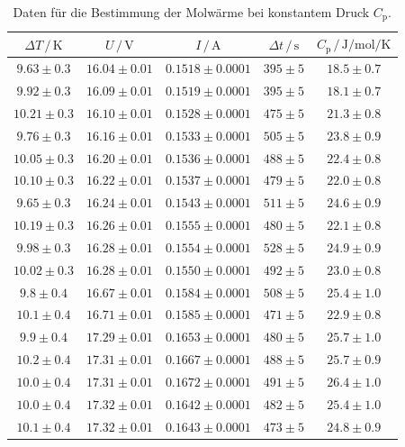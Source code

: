 \begin{table}
  \centering
  \caption{Daten für die Bestimmung der Molwärme bei konstantem Druck $C_\mathrm{p}$.}
  \label{tab:tab1}
  \begin{tabular}{c c c c c}
    \toprule
		$\Delta T \, / \, \si{\kelvin}$ & $U \, / \, \si{\volt}$ & $I \, / \, \si{\ampere}$ & $\Delta t \, / \, \si{\second} $ & $C_\mathrm{p} \, / \, \si{\joule\per\mole\per\kelvin}$ \\
    \midrule
    $9.63\pm0.3$ & $16.04\pm0.01$ & $0.1518\pm0.0001$ & $395\pm5$ & $18.5\pm0.7$ \\
    $9.92\pm0.3$ & $16.09\pm0.01$ & $0.1519\pm0.0001$ & $395\pm5$ & $18.1\pm0.7$ \\
    $10.21\pm0.3$ & $16.10\pm0.01$ & $0.1528\pm0.0001$ & $475\pm5$ & $21.3\pm0.8$ \\
    $9.76\pm0.3$ & $16.16\pm0.01$ & $0.1533\pm0.0001$ & $505\pm5$ & $23.8\pm0.9$ \\
    $10.05\pm0.3$ & $16.20\pm0.01$ & $0.1536\pm0.0001$ & $488\pm5$ & $22.4\pm0.8$ \\
    $10.10\pm0.3$ & $16.22\pm0.01$ & $0.1537\pm0.0001$ & $479\pm5$ & $22.0\pm0.8$ \\
    $9.65\pm0.3$ & $16.24\pm0.01$ & $0.1543\pm0.0001$ & $511\pm5$ & $24.6\pm0.9$ \\
    $10.19\pm0.3$ & $16.26\pm0.01$ & $0.1555\pm0.0001$ & $480\pm5$ & $22.1\pm0.8$ \\
    $9.98\pm0.3$ & $16.28\pm0.01$ & $0.1554\pm0.0001$ & $528\pm5$ & $24.9\pm0.9$ \\
    $10.02\pm0.3$ & $16.28\pm0.01$ & $0.1550\pm0.0001$ & $492\pm5$ & $23.0\pm0.8$ \\
    $9.8\pm0.4$ & $16.67\pm0.01$ & $0.1584\pm0.0001$ & $508\pm5$ & $25.4\pm1.0$ \\
    $10.1\pm0.4$ & $16.71\pm0.01$ & $0.1585\pm0.0001$ & $471\pm5$ & $22.9\pm0.8$ \\
    $9.9\pm0.4$ & $17.29\pm0.01$ & $0.1653\pm0.0001$ & $480\pm5$ & $25.7\pm1.0$ \\
    $10.2\pm0.4$ & $17.31\pm0.01$ & $0.1667\pm0.0001$ & $488\pm5$ & $25.7\pm0.9$ \\
    $10.0\pm0.4$ & $17.31\pm0.01$ & $0.1672\pm0.0001$ & $491\pm5$ & $26.4\pm1.0$ \\
    $10.0\pm0.4$ & $17.32\pm0.01$ & $0.1642\pm0.0001$ & $482\pm5$ & $25.4\pm1.0$ \\
    $10.1\pm0.4$ & $17.32\pm0.01$ & $0.1643\pm0.0001$ & $473\pm5$ & $24.8\pm0.9$ \\
    \bottomrule
  \end{tabular}
\end{table}
